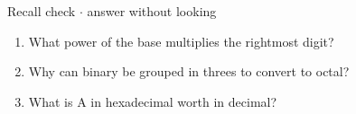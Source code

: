 \documentclass[11pt]{article}
\begin{document}
\begin{keepsection}
\begin{keepsection}
\begin{recallbox}{Recall check \ensuremath{\cdot} answer without looking}
\begin{enumerate}
\item What power of the base multiplies the rightmost digit?
\item Why can binary be grouped in threes to convert to octal?
\item What is A in hexadecimal worth in decimal?
\end{enumerate}

\end{recallbox}
\end{keepsection}
\end{keepsection}
\end{document}
